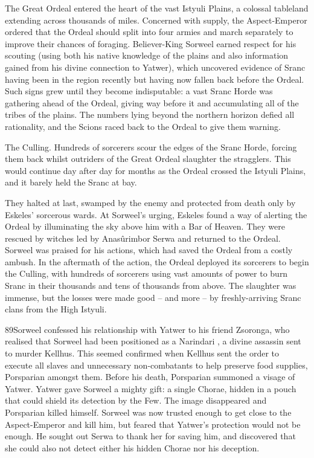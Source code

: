 \documentclass[]{book}
\begin{document}
The Great Ordeal entered the heart of the vast Istyuli Plains, a colossal tableland
extending across thousands of miles. Concerned with supply, the Aspect-Emperor
ordered that the Ordeal should split into four armies and march separately to improve
their chances of foraging. Believer-King Sorweel earned respect for his scouting (using
both his native knowledge of the plains and also information gained from his divine connection to Yatwer), which uncovered evidence of Sranc having been in the region
recently but having now fallen back before the Ordeal. Such signs grew until they
become indisputable: a vast Sranc Horde was gathering ahead of the Ordeal, giving way
before it and accumulating all of the tribes of the plains. The numbers lying beyond the
northern horizon defied all rationality, and the Scions raced back to the Ordeal to give
them warning.

The Culling. Hundreds of sorcerers scour the edges of the Sranc Horde, forcing them back whilst outriders of the Great Ordeal slaughter the stragglers. This would continue day after day for months as the Ordeal crossed the Istyuli Plains, and it barely held the Sranc at bay.

They halted at last, swamped by the enemy and protected from death only by Eskeles'
sorcerous wards. At Sorweel's urging, Eskeles found a way of alerting the Ordeal by
illuminating the sky above him with a Bar of Heaven. They were rescued by witches led
by Anasûrimbor Serwa and returned to the Ordeal. Sorweel was praised for his actions,
which had saved the Ordeal from a costly ambush. In the aftermath of the action, the
Ordeal deployed its sorcerers to begin the Culling, with hundreds of sorcerers using
vast amounts of power to burn Sranc in their thousands and tens of thousands from
above. The slaughter was immense, but the losses were made good -- and more -- by
freshly-arriving Sranc clans from the High Istyuli.

89Sorweel confessed his relationship with Yatwer to his friend Zsoronga, who realised that
Sorweel had been positioned as a Narindari , a divine assassin sent to murder Kellhus.
This seemed confirmed when Kellhus sent the order to execute all slaves and
unnecessary non-combatants to help preserve food supplies, Porsparian amongst them.
Before his death, Porsparian summoned a visage of Yatwer. Yatwer gave Sorweel a
mighty gift: a single Chorae, hidden in a pouch that could shield its detection by the
Few. The image disappeared and Porsparian killed himself. Sorweel was now trusted
enough to get close to the Aspect-Emperor and kill him, but feared that Yatwer's
protection would not be enough. He sought out Serwa to thank her for saving him, and
discovered that she could also not detect either his hidden Chorae nor his deception.
\end{document}
